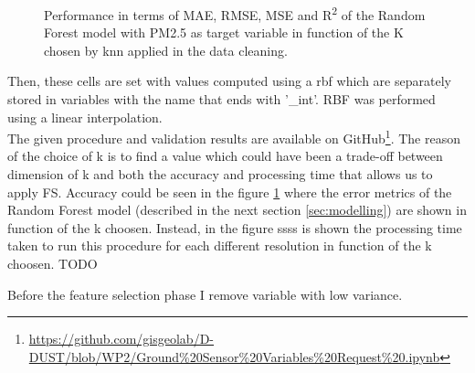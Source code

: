 \begin{figure}[H] 
    \centering
    \hfill%
    \caption{Performance in terms of MAE, RMSE, MSE and R\textsuperscript{2} of the Random Forest model with PM2.5 as target variable in function of the K chosen by \acrshort{knn} applied in the data cleaning.}
    \label{fig:knn_chosen}
\end{figure}
Then, these cells are set with values computed using a \gls{rbf} \cite{wright2003radial} which are separately stored in variables with the name that ends with '\_int'. RBF was performed using a linear interpolation.\\
The given procedure and validation results are available on GitHub\footnote{\url{https://github.com/gisgeolab/D-DUST/blob/WP2/Ground\%20Sensor\%20Variables\%20Request\%20.ipynb}}.
The reason of the choice of k is to find a value which could have been a trade-off between dimension of k and both the accuracy and processing time that allows us to apply FS.
Accuracy could be seen in the figure \ref{fig:knn_chosen} where the error metrics of the Random Forest model (described in the next section \ref{sec:modelling}) are shown in function of the k choosen.
Instead, in the figure ssss is shown the processing time taken to run this procedure for each different resolution in function of the k choosen. 
TODO
\par
Before the feature selection phase I remove variable with low variance.
